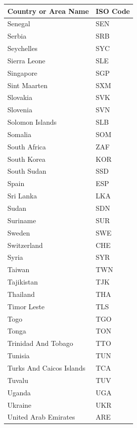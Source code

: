 \documentclass{report}
\begin{document}
\begin{center}
    \newpage
    \begin{minipage}{0.46\textwidth}
        \begin{tabular}{|p{10.5em}|p{6em}|}
            \hline
            Country or Area Name & ISO Code\\
            \hline
            Senegal & SEN\\
            Serbia & SRB\\
            Seychelles & SYC\\
            Sierra Leone & SLE\\
            Singapore & SGP\\
            Sint Maarten & SXM\\
            Slovakia & SVK\\
            Slovenia & SVN\\
            Solomon Islands & SLB\\
            Somalia & SOM\\
            South Africa & ZAF\\
            South Korea & KOR\\
            South Sudan & SSD\\
            Spain & ESP\\
            Sri Lanka & LKA\\
            Sudan & SDN\\
            Suriname & SUR\\
            Sweden & SWE\\
            Switzerland & CHE\\
            Syria & SYR\\
            Taiwan & TWN\\
            Tajikistan & TJK\\
            Thailand & THA\\
            Timor Leste & TLS\\
            Togo & TGO\\
            Tonga & TON\\
            Trinidad And Tobago & TTO\\
            Tunisia & TUN\\
            Turks And Caicos Islands & TCA\\
            Tuvalu & TUV\\
            Uganda & UGA\\
            Ukraine & UKR\\
            United Arab Emirates & ARE\\

\end{tabular}
\end{minipage}
\end{center}
\end{document}
